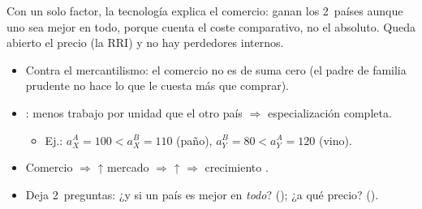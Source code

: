 \documentclass{article}
\begin{document}
\begin{columnas}
\begin{ideaclave}
Con un solo factor, la tecnología explica el comercio: ganan los 2~países aunque uno sea mejor en todo, porque cuenta el coste comparativo, no el absoluto. Queda abierto el precio (la RRI) y no hay perdedores internos.
\end{ideaclave}

\begin{itemize}
\item Contra el mercantilismo: el comercio no es de suma cero (el padre de familia prudente no hace lo que le cuesta más que comprar).
\item {}: menos trabajo por unidad que el otro país $\Rightarrow$ especialización completa.
  \begin{itemize}
  \item Ej.: $a_X^A=100<a_X^B=110$ (paño), $a_Y^B=80<a_Y^A=120$ (vino).
  \end{itemize}
\item Comercio $\Rightarrow$ ↑ mercado $\Rightarrow$ ↑  $\Rightarrow$ crecimiento .
\item Deja 2~preguntas: ¿y si un país es mejor en \emph{todo}? (); ¿a qué precio? ().
\end{itemize}


\end{columnas}
\end{document}
